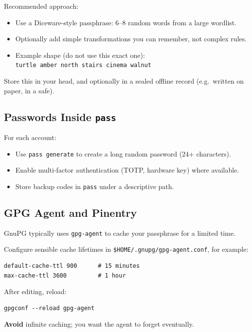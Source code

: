 \documentclass[11pt,a4paper]{article}
\newcommand{\cmd}[1]{\texttt{#1}}
\newcommand{\file}[1]{\texttt{#1}}
\begin{document}
Recommended approach:

\begin{itemize}[noitemsep]
  \item Use a Diceware-style passphrase: 6--8 random words from a large wordlist.
  \item Optionally add simple transformations you can remember, not complex rules.
  \item Example shape (do not use this exact one):\\
        \texttt{turtle amber north stairs cinema walnut}
\end{itemize}

Store this in your head, and optionally in a sealed offline record (e.g.\ written on paper, in a safe).

\subsection{Passwords Inside \texttt{pass}}

For each account:

\begin{itemize}[noitemsep]
  \item Use \cmd{pass generate} to create a long random password (24+ characters).
  \item Enable multi-factor authentication (TOTP, hardware key) where available.
  \item Store backup codes in \texttt{pass} under a descriptive path.
\end{itemize}

\subsection{GPG Agent and Pinentry}

GnuPG typically uses \cmd{gpg-agent} to cache your passphrase for a limited time.

Configure sensible cache lifetimes in \file{\$HOME/.gnupg/gpg-agent.conf}, for example:

\begin{verbatim}
default-cache-ttl 900      # 15 minutes
max-cache-ttl 3600         # 1 hour
\end{verbatim}

After editing, reload:

\begin{verbatim}
gpgconf --reload gpg-agent
\end{verbatim}

\textbf{Avoid} infinite caching; you want the agent to forget eventually.
\end{document}
